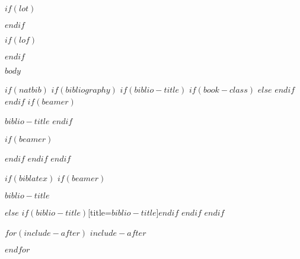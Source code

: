 \documentclass[$if(fontsize)$$fontsize$,$endif$$if(lang)$$babel-lang$,$endif$$if(papersize)$$papersize$paper,$endif$$if(beamer)$ignorenonframetext,$if(handout)$handout,$endif$$if(aspectratio)$aspectratio=$aspectratio$,$endif$$endif$$for(classoption)$$classoption$$sep$,$endfor$]{$documentclass$}
\newif\ifbibliography
\begin{document}
  $if(lot)$
    \listoftables
  $endif$

  $if(lof)$
    \listoffigures
  $endif$

\newpage %

\pagestyle{fancy}
$body$

$if(natbib)$
  $if(bibliography)$
    $if(biblio-title)$
      $if(book-class)$
        \renewcommand\bibname{$biblio-title$}
      $else$
        \renewcommand\refname{$biblio-title$}
      $endif$
    $endif$
    $if(beamer)$
      \begin{frame}[allowframebreaks]{$biblio-title$}
      \bibliographytrue
    $endif$
    
    $if(beamer)$
      \end{frame}
    $endif$
  $endif$
$endif$

$if(biblatex)$
  $if(beamer)$
    \begin{frame}[allowframebreaks]{$biblio-title$}
      \bibliographytrue
      \printbibliography[heading=none]
    \end{frame}
  $else$
    \printbibliography$if(biblio-title)$[title=$biblio-title$]$endif$
  $endif$
$endif$

$for(include-after)$
$include-after$

$endfor$
\end{document}
